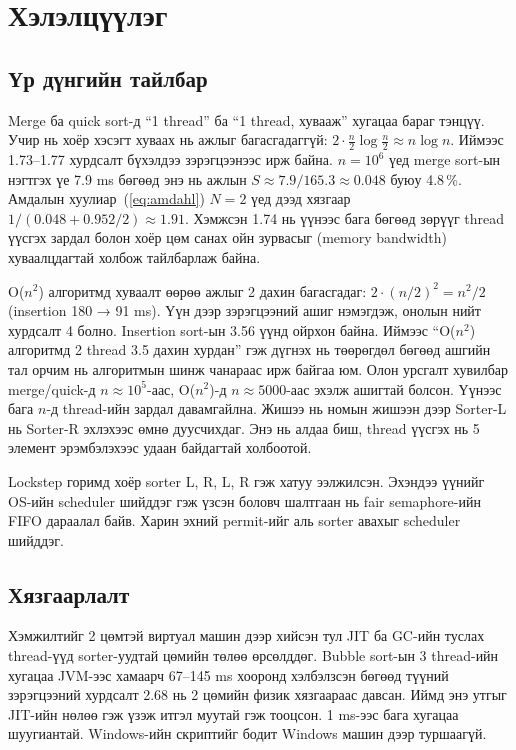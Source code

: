 \chapter{Хэлэлцүүлэг}\label{ch:disc}

\section{Үр дүнгийн тайлбар}
Merge ба quick sort-д “1 thread” ба “1 thread, хувааж” хугацаа бараг тэнцүү. Учир нь хоёр хэсэгт хуваах нь
ажлыг багасгадаггүй: $2\cdot\frac{n}{2}\log\frac{n}{2} \approx n\log n$. Иймээс 1.73--1.77 хурдсалт бүхэлдээ
зэрэгцээнээс ирж байна. $n = 10^6$ үед merge sort-ын нэгтгэх үе 7.9 ms бөгөөд энэ нь ажлын
$S \approx 7.9/165.3 \approx 0.048$ буюу 4.8\,\%. Амдалын хуулиар~(\ref{eq:amdahl}) $N = 2$ үед дээд хязгаар
$1/(0.048 + 0.952/2) \approx 1.91$. Хэмжсэн 1.74 нь үүнээс бага бөгөөд зөрүүг thread үүсгэх зардал болон хоёр
цөм санах ойн зурвасыг (memory bandwidth) хуваалцдагтай холбож тайлбарлаж байна.

O($n^2$) алгоритмд хуваалт өөрөө ажлыг 2 дахин багасгадаг: $2\cdot(n/2)^2 = n^2/2$ (insertion 180 → 91 ms). Үүн
дээр зэрэгцээний ашиг нэмэгдэж, онолын нийт хурдсалт 4 болно. Insertion sort-ын 3.56 үүнд ойрхон байна. Иймээс
“O($n^2$) алгоритмд 2 thread 3.5 дахин хурдан” гэж дүгнэх нь төөрөгдөл бөгөөд ашгийн тал орчим нь алгоритмын
шинж чанараас ирж байгаа юм. Олон урсгалт хувилбар merge/quick-д $n \approx 10^5$-аас, O($n^2$)-д $n \approx 5000$-аас
эхэлж ашигтай болсон. Үүнээс бага $n$-д thread-ийн зардал давамгайлна. Жишээ нь номын жишээн дээр Sorter-L нь
Sorter-R эхлэхээс өмнө дуусчихдаг. Энэ нь алдаа биш, thread үүсгэх нь 5 элемент эрэмбэлэхээс удаан байдагтай холбоотой.

Lockstep горимд хоёр sorter L, R, L, R гэж хатуу ээлжилсэн. Эхэндээ үүнийг OS-ийн scheduler шийддэг гэж үзсэн боловч
шалтгаан нь fair semaphore-ийн FIFO дараалал байв. Харин эхний permit-ийг аль sorter авахыг scheduler шийддэг.

\section{Хязгаарлалт}\label{sec:limitations}
Хэмжилтийг 2 цөмтэй виртуал машин дээр хийсэн тул JIT ба GC-ийн туслах thread-үүд sorter-уудтай цөмийн төлөө
өрсөлддөг. Bubble sort-ын 3 thread-ийн хугацаа JVM-ээс хамаарч 67--145 ms хооронд хэлбэлзсэн бөгөөд түүний
зэрэгцээний хурдсалт 2.68 нь 2 цөмийн физик хязгаараас давсан. Иймд энэ утгыг JIT-ийн нөлөө гэж үзэж итгэл муутай
гэж тооцсон. 1 ms-ээс бага хугацаа шуугиантай. Windows-ийн  скриптийг бодит Windows машин дээр туршаагүй.

